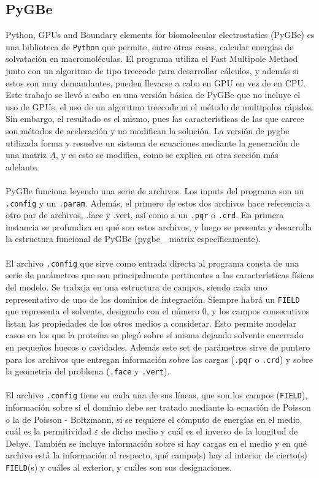 \documentclass[12pt, oneside, numbers, spanish]{ezthesis}
\numberwithin{equation}{section}
\begin{document}
\subsection{PyGBe}\label{subsec:PyGBe}
Python, GPUs and Boundary elements for biomolecular electrostatics (PyGBe) es una biblioteca de \texttt{Python} que permite, entre otras cosas, calcular energías de solvatación en macromoléculas. El programa utiliza el Fast Multipole Method junto con un algoritmo de tipo treecode para desarrollar cálculos, y además si estos son muy demandantes, pueden llevarse a cabo en GPU en vez de en CPU. Este trabajo se llevó a cabo en una versión básica de PyGBe que no incluye el uso de GPUs, el uso de un algoritmo treecode ni el método de multipolos rápidos. Sin embargo, el resultado es el mismo, pues las características de las que carece son métodos de aceleración y no modifican la solución. La versión de pygbe utilizada forma y resuelve un sistema de ecuaciones mediante la generación de una matriz $\underline{A}$, y es esto se modifica, como se explica en otra sección más adelante.\\\\
PyGBe funciona leyendo una serie de archivos. Los inputs del programa son un \texttt{.config} y un \texttt{.param}. Además, el primero de estos dos archivos hace referencia a otro par de archivos, .face y .vert, así como a un \texttt{.pqr} o \texttt{.crd}. En primera instancia se profundiza en qué son estos archivos, y luego se presenta y desarrolla la estructura funcional de PyGBe (pygbe\_ matrix específicamente).\\\\
El archivo \texttt{.config} que sirve como entrada directa al programa consta de una serie de parámetros que son principalmente pertinentes a las características físicas del modelo. Se trabaja en una estructura de campos, siendo cada uno representativo de uno de los dominios de integración. Siempre habrá un \texttt{FIELD} que representa el solvente, designado con el número 0, y los campos consecutivos listan las propiedades de los otros medios a considerar. Esto permite modelar casos en los que la proteína se plegó sobre sí misma dejando solvente encerrado en pequeños huecos o cavidades. Además este set de parámetros sirve de puntero para los archivos que entregan información sobre las cargas (\texttt{.pqr} o \texttt{.crd}) y sobre la geometría del problema (\texttt{.face} y \texttt{.vert}).\\\\
El archivo \texttt{.config} tiene en cada una de sus líneas, que son los campos (\texttt{FIELD}), información sobre si el dominio debe ser tratado mediante la ecuación de Poisson o la de Poisson - Boltzmann, si se requiere el cómputo de energías en el medio, cuál es la permitividad $\varepsilon$ de dicho medio y cuál es el inverso de la longitud de Debye. También se incluye información sobre si hay cargas en el medio y en qué archivo está la información al respecto, qué campo(s) hay al interior de cierto(s) \texttt{FIELD}(s) y cuáles al exterior, y cuáles son sus designaciones.\\\\
\end{document}
